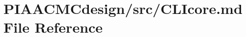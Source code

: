 \hypertarget{PIAACMCdesign_2src_2CLIcore_8md}{\section{P\+I\+A\+A\+C\+M\+Cdesign/src/\+C\+L\+Icore.md File Reference}
\label{PIAACMCdesign_2src_2CLIcore_8md}
}
